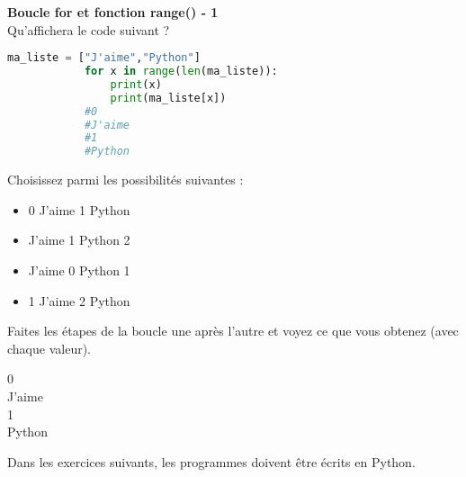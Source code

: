	\begin{Exercice}[5 minutes] \textbf{Boucle for et fonction range() - 1}\\
      	Qu'affichera le code suivant ?
      	
      	\begin{lstlisting}[language=Python]
         	ma_liste = ["J'aime","Python"]
      		for x in range(len(ma_liste)):
      			print(x)
           		print(ma_liste[x])
           	#0
           	#J'aime
           	#1
           	#Python
     	\end{lstlisting}
             	
        Choisissez parmi les possibilités suivantes :
        
        \begin{itemize}
        
        \item 0 
        J'aime 
        1 
        Python 
        \item J'aime  
        1 
        Python 
        2     
        \item J'aime 
        0 
        Python 
        1 
        \item 1 
        J'aime 
        2
        Python
        \end{itemize}
    
        \begin{conseil}
		   Faites les étapes de la boucle une après l'autre et voyez ce que vous obtenez (avec chaque valeur).  
        \end{conseil}
        
        \begin{solution}
            0\\
            J'aime\\
            1\\
            Python
            
        \end{solution}
    \end{Exercice} 	
	
	Dans les exercices suivants, les programmes doivent être écrits en Python.\\\\	
	
